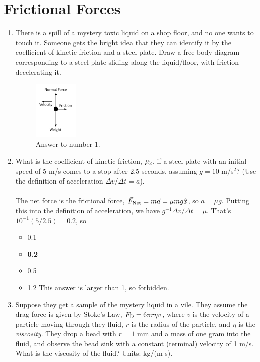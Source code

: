 \documentclass[10pt]{article}
\begin{document}
\section{Frictional Forces}
\begin{enumerate}
\item There is a spill of a mystery toxic liquid on a shop floor, and no one wants to touch it.  Someone gets the bright idea that they can identify it by the coefficient of kinetic friction and a steel plate.  Draw a free body diagram corresponding to a steel plate sliding along the liquid/floor, with friction decelerating it.\\
\begin{figure}[ht]
\centering
\includegraphics[width=0.2\textwidth]{figures/FBD3.pdf}
\caption{\label{fig:fbd3} Answer to number 1.}
\end{figure}
\item What is the coefficient of kinetic friction, $\mu_{\rm k}$, if a steel plate with an initial speed of 5 m/s comes to a stop after 2.5 seconds, assuming $g = 10$ m/s$^2$?  (Use the definition of acceleration $\Delta v/\Delta t = a$). \\ \\
The net force is the frictional force, $\vec{F}_{\rm Net} = m\vec{a} = \mu m g \hat{x}$, so $a = \mu g$.  Putting this into the definition of acceleration, we have $g^{-1} \Delta v/\Delta t = \mu$.  That's $10^{-1} (5/2.5) = 0.2$, so
\begin{itemize}
\item 0.1
\item \textbf{0.2}
\item 0.5
\item 1.2 This answer is larger than 1, so forbidden.
\end{itemize}
\item Suppose they get a sample of the mystery liquid in a vile.  They assume the drag force is given by Stoke's Law, $F_{\rm D} = 6\pi r \eta v$, where $v$ is the velocity of a particle moving through they fluid, $r$ is the radius of the particle, and $\eta$ is the \textit{viscosity}.  They drop a bead with $r = 1$ mm and a mass of one gram into the fluid, and observe the bead sink with a constant (terminal) velocity of 1 m/s.  What is the viscosity of the fluid?  Units: kg/(m s). \\ \\

\end{enumerate}
\end{document}
